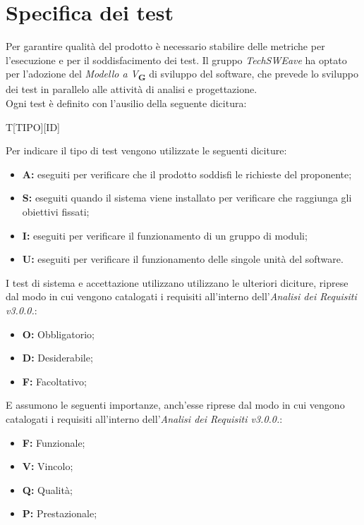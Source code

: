 \section{Specifica dei test}
Per garantire qualità del prodotto è necessario stabilire delle metriche per l’esecuzione e per il soddisfacimento dei test.
Il gruppo \textit{TechSWEave} ha optato per l'adozione del \textit{Modello a V}\textsubscript{\textbf{G}} di sviluppo del software, che
prevede lo sviluppo dei test in parallelo alle attività di analisi e progettazione.\\
Ogni test è definito con l'ausilio della seguente dicitura:\\
\begin{center}
    T[TIPO][ID]
\end{center}
Per indicare il tipo di test vengono utilizzate le seguenti diciture:
\begin{itemize}
    \item \textbf{A:} eseguiti per verificare che il prodotto soddisfi le richieste del proponente;
    \item \textbf{S:} eseguiti quando il sistema viene installato per verificare che raggiunga gli obiettivi fissati;
    \item \textbf{I:} eseguiti per verificare il funzionamento di un gruppo di moduli;
    \item \textbf{U:} eseguiti per verificare il funzionamento delle singole unità del software.
\end{itemize}
I test di sistema e accettazione utilizzano utilizzano le ulteriori diciture, riprese dal modo in cui vengono catalogati i requisiti all'interno dell'\textit{Analisi dei Requisiti v3.0.0.}:
\begin{itemize}
    \item \textbf{O:} Obbligatorio;
    \item \textbf{D:} Desiderabile;
    \item \textbf{F:} Facoltativo;
\end{itemize}
E assumono le seguenti importanze, anch'esse riprese dal modo in cui vengono catalogati i requisiti all'interno dell'\textit{Analisi dei Requisiti v3.0.0.}:
\begin{itemize}
    \item \textbf{F:} Funzionale;
    \item \textbf{V:} Vincolo;
    \item \textbf{Q:} Qualità;
    \item \textbf{P:} Prestazionale;
\end{itemize}
